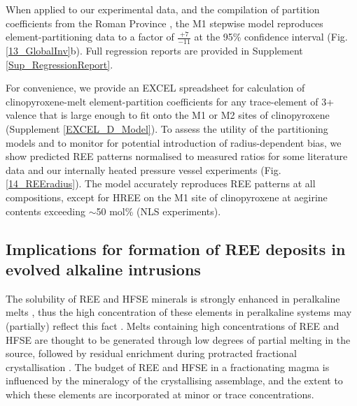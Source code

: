 \documentclass[final,authoryear,3p,times,twocolumn]{elsarticle}
\begin{document}
When applied to our experimental data, and the compilation of partition coefficients from the Roman Province \citep{Fedele2009, Mollo2013, Mollo2016}, the M1 stepwise model reproduces element-partitioning data to a factor of $\frac{+7}{-11}$ at the 95\% confidence interval (Fig. \ref{13_GlobalInv}b). Full regression reports are provided in Supplement \ref{Sup_RegressionReport}. 


For convenience, we provide an EXCEL spreadsheet for calculation of clinopyroxene-melt element-partition coefficients for any trace-element of 3+ valence that is large enough to fit onto the M1 or M2 sites of clinopyroxene (Supplement \ref{EXCEL_D_Model}). 
	To assess the utility of the partitioning models and to monitor for potential introduction of radius-dependent bias, we show predicted REE patterns normalised to measured ratios for some literature data and our internally heated pressure vessel experiments (Fig. \ref{14_REEradius}). The model accurately reproduces REE patterns at all compositions, except for HREE on the M1 site of clinopyroxene at aegirine contents exceeding $\sim$50 mol\% (NLS experiments).

		                         

\subsection{Implications for formation of REE deposits in evolved alkaline intrusions}
The solubility of REE and HFSE minerals is strongly enhanced in peralkaline melts \citep{Watson1979, Linnen1997, Boehnke2013, Aseri2015}, thus the high concentration of these elements in peralkaline systems may (partially) reflect this fact \citep{Dostal2017}. Melts containing high concentrations of REE and HFSE are thought to be generated through low degrees of partial melting in the source, followed by residual enrichment during protracted fractional crystallisation \citep{Marks2017}. The budget of REE and HFSE in a fractionating magma is influenced by the mineralogy of the crystallising assemblage, and the extent to which these elements are incorporated at minor or trace concentrations.
\end{document}
